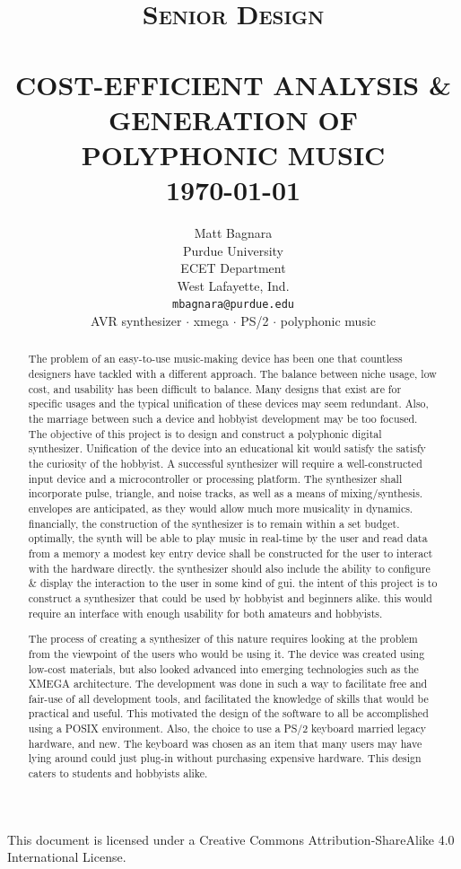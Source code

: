 \documentclass[bibtotocnumbered,abstract=on,paper=a4,fontsize=12pt,parskip=on,halfparskip=on]{scrartcl}		%
\title{	\normalsize \textsc{Senior Design} 	%
		 	\\[2.0cm]													%
			\HRule{0.5pt} \\										%
			\LARGE \textbf{\uppercase{Cost-Efficient Analysis \& Generation of Polyphonic Music}}	%
			\HRule{2pt} \\ [0.5cm]								%
			\normalsize \today									%
		}
\author{
		Matt Bagnara\\	
		Purdue University\\	
		ECET Department\\
    West Lafayette, Ind.\\
    \texttt{mbagnara@purdue.edu} \\ 
    \vskip 1cm 
    \scriptsize{AVR synthesizer $\cdot$ xmega $\cdot$ PS/2 $\cdot$ polyphonic music}\\
}
\makeatletter
\def\printtitle{%
    {\centering \@title\par}}
\def\printauthor{%
    {\centering \large \@author}}
\makeatother
\begin{document}
\begin{titlepage}
\thispagestyle{empty}				%

\printtitle									%
  	\vfill
\printauthor								%
    \vfill
This document is licensed under a Creative  Commons Attribution-ShareAlike 4.0 International License.
\end{titlepage}
\newpage
\begin{abstract}
The problem of an easy-to-use music-making device has been one that countless designers have tackled with a different approach. The balance between niche usage, low cost, and usability has been difficult to balance. Many designs that exist are for specific usages and the typical unification of these devices may seem redundant. Also, the marriage between such a device and hobbyist development may be too focused. The objective of this project is to design and construct a polyphonic digital synthesizer. Unification of the device into an educational kit would satisfy the satisfy the curiosity of the hobbyist. A successful synthesizer will require a well-constructed input device and a microcontroller or processing platform. The synthesizer shall incorporate pulse, triangle, and noise tracks, as well as a means of mixing/synthesis. envelopes are anticipated, as they would allow much more musicality in dynamics. financially, the construction of the synthesizer is to remain within a set budget. optimally, the synth will be able to play music in real-time by the user and read data from a memory a modest key entry device shall be constructed for the user to interact with the hardware directly. the synthesizer should also include the ability to configure \& display the interaction to the user in some kind of gui. the intent of this project is to construct a synthesizer that could be used by hobbyist and beginners alike. this would require an interface with enough usability for both amateurs and hobbyists.

The process of creating a synthesizer of this nature requires looking at the problem from the viewpoint of the users who would be using it. The device was created using low-cost materials, but also looked advanced into emerging technologies such as the XMEGA architecture. The development was done in such a way to facilitate free and fair-use of all development tools, and facilitated the knowledge of skills that would be practical and useful.  This motivated the design of the software to all be accomplished using a POSIX environment. Also, the choice to use a PS/2 keyboard married legacy hardware, and new. The keyboard was chosen as an item that many users may have lying around could just plug-in without purchasing expensive hardware. This design caters to students and hobbyists alike.


\end{abstract}
\end{document}
